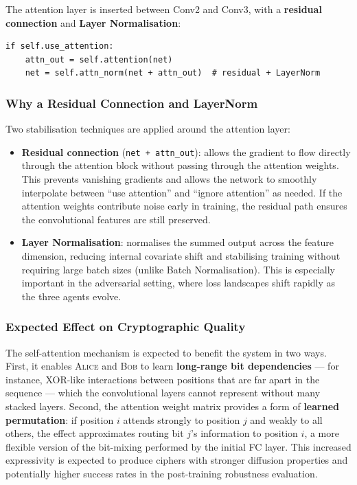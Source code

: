 \documentclass[12pt, a4paper]{article}
\newcommand{\alice}{\textsc{Alice}}
\newcommand{\bob}{\textsc{Bob}}
\newcommand{\code}[1]{\texttt{\color{CodeRed}#1}}
\begin{document}
The attention layer is inserted between Conv2 and Conv3, with a
\textbf{residual connection} and \textbf{Layer Normalisation}:

\begin{lstlisting}[caption={Residual attention block in \code{CipherNet.call()}}]
if self.use_attention:
    attn_out = self.attention(net)
    net = self.attn_norm(net + attn_out)  # residual + LayerNorm
\end{lstlisting}

\subsubsection*{Why a Residual Connection and LayerNorm}

Two stabilisation techniques are applied around the attention layer:

\begin{itemize}[leftmargin=1.8em, itemsep=4pt]
  \item \textbf{Residual connection} (\code{net + attn\_out}): allows
        the gradient to flow directly through the attention block
        without passing through the attention weights. This prevents
        vanishing gradients and allows the network to smoothly
        interpolate between ``use attention'' and ``ignore attention''
        as needed. If the attention weights contribute noise early
        in training, the residual path ensures the convolutional
        features are still preserved.
  \item \textbf{Layer Normalisation}: normalises the summed output
        across the feature dimension, reducing internal covariate
        shift and stabilising training without requiring large
        batch sizes (unlike Batch Normalisation). This is especially
        important in the adversarial setting, where loss landscapes
        shift rapidly as the three agents evolve.
\end{itemize}

\subsubsection*{Expected Effect on Cryptographic Quality}

The self-attention mechanism is expected to benefit the system in
two ways. First, it enables \alice{} and \bob{} to learn
\textbf{long-range bit dependencies} — for instance, XOR-like
interactions between positions that are far apart in the sequence —
which the convolutional layers cannot represent without many stacked
layers. Second, the attention weight matrix provides a form of
\textbf{learned permutation}: if position $i$ attends strongly to
position $j$ and weakly to all others, the effect approximates
routing bit $j$'s information to position $i$, a more flexible
version of the bit-mixing performed by the initial FC layer.
This increased expressivity is expected to produce ciphers with
stronger diffusion properties and potentially higher success rates
in the post-training robustness evaluation.
\end{document}
